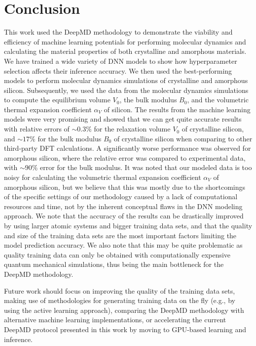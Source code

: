 \chapter{Conclusion}

This work used the DeepMD methodology to demonstrate the viability and
efficiency of machine learning potentials for performing molecular dynamics
and calculating the material properties of both crystalline and amorphous
materials. We have trained a wide variety of DNN models to show how
hyperparameter selection affects their inference accuracy. We then used the
best-performing models to perform molecular dynamics simulations of crystalline and amorphous silicon. Subsequently, we
used the data from the molecular dynamics simulations to compute the
equilibrium volume $V_0$, the bulk modulus $B_0$, and the volumetric thermal
expansion coefficient $\alpha_V$ of silicon. The results from the machine
learning models were very promising and showed that we can get quite accurate
results with relative errors of $\sim 0.3\%$ for the relaxation volume $V_0$
of crystalline silicon, and $\sim 17 \%$ for the bulk modulus $B_0$ of crystalline
silicon when comparing to other third-party DFT calculations. A significantly
worse performance was observed for amorphous silicon, where the relative error
was compared to experimental data, with $\sim 90 \%$ error for the bulk modulus.
It was noted that our modeled data is too noisy for calculating the volumetric
thermal expansion coefficient $\alpha_V$ of amorphous silicon, but we believe that this
was mostly due to the shortcomings of the specific settings of our methodology
caused by a lack of computational resources and time, not by the inherent conceptual flaws in
the DNN modeling approach. We note that the accuracy of the results can be
drastically improved by using larger atomic systems and bigger training data sets,
and that the quality and size of the training data sets are the most important factors limiting the
model prediction accuracy. We also note that this may be quite problematic as
quality training data can only be obtained with computationally expensive
quantum mechanical simulations, thus being the main bottleneck for the DeepMD
methodology.

Future work should focus on improving the quality of the training data sets,
making use of methodologies for generating training data on the fly (e.g., by
using the active learning approach), comparing the DeepMD methodology with
alternative machine learning implementations, or accelerating the current DeepMD
protocol presented in this work by moving to GPU-based learning and inference.

